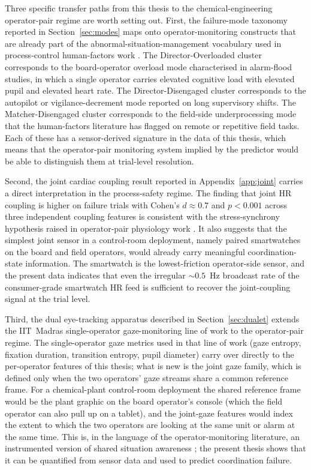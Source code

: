Three specific transfer paths from this thesis to the chemical-engineering operator-pair regime are worth setting out. First, the failure-mode taxonomy reported in Section~\ref{sec:modes} maps onto operator-monitoring constructs that are already part of the abnormal-situation-management vocabulary used in process-control human-factors work \cite{bhavsar2017eye,iqbal2024multi,iqbal2020dynamic}. The Director-Overloaded cluster corresponds to the board-operator overload mode characterised in alarm-flood studies, in which a single operator carries elevated cognitive load with elevated pupil and elevated heart rate. The Director-Disengaged cluster corresponds to the autopilot or vigilance-decrement mode reported on long supervisory shifts. The Matcher-Disengaged cluster corresponds to the field-side underprocessing mode that the human-factors literature has flagged on remote or repetitive field tasks. Each of these has a sensor-derived signature in the data of this thesis, which means that the operator-pair monitoring system implied by the predictor would be able to distinguish them at trial-level resolution.

Second, the joint cardiac coupling result reported in Appendix~\ref{app:joint} carries a direct interpretation in the process-safety regime. The finding that joint HR coupling is higher on failure trials with Cohen's $d \approx 0.7$ and $p < 0.001$ across three independent coupling features is consistent with the stress-synchrony hypothesis raised in operator-pair physiology work \cite{verdiere2020thms,sharika2024heart}. It also suggests that the simplest joint sensor in a control-room deployment, namely paired smartwatches on the board and field operators, would already carry meaningful coordination-state information. The smartwatch is the lowest-friction operator-side sensor, and the present data indicates that even the irregular $\sim$$0.5$~Hz broadcast rate of the consumer-grade smartwatch HR feed is sufficient to recover the joint-coupling signal at the trial level.

Third, the dual eye-tracking apparatus described in Section~\ref{sec:dualet} extends the IIT~Madras single-operator gaze-monitoring line of work \cite{bhavsar2017eye,iqbal2024multi,iqbal2020dynamic,sharma2016eye,shahab2021metrics} to the operator-pair regime. The single-operator gaze metrics used in that line of work (gaze entropy, fixation duration, transition entropy, pupil diameter) carry over directly to the per-operator features of this thesis; what is new is the joint gaze family, which is defined only when the two operators' gaze streams share a common reference frame. For a chemical-plant control-room deployment the shared reference frame would be the plant graphic on the board operator's console (which the field operator can also pull up on a tablet), and the joint-gaze features would index the extent to which the two operators are looking at the same unit or alarm at the same time. This is, in the language of the operator-monitoring literature, an instrumented version of shared situation awareness \cite{endsley1995toward,salmon2008what,stanton2017state}; the present thesis shows that it can be quantified from sensor data and used to predict coordination failure.

